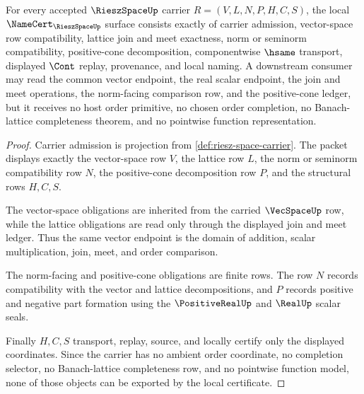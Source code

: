 \begin{theorem}
\label{thm:riesz-space-namecert-obligations}
For every accepted $\RieszSpaceUp$ carrier $R=(V,L,N,P,H,C,S)$, the local $\NameCert_{\RieszSpaceUp}$ surface consists exactly of carrier admission, vector-space row compatibility, lattice join and meet exactness, norm or seminorm compatibility, positive-cone decomposition, componentwise $\hsame$ transport, displayed $\Cont$ replay, provenance, and local naming. A downstream consumer may read the common vector endpoint, the real scalar endpoint, the join and meet operations, the norm-facing comparison row, and the positive-cone ledger, but it receives no host order primitive, no chosen order completion, no Banach-lattice completeness theorem, and no pointwise function representation.
\end{theorem}
\begin{proof}
Carrier admission is projection from \autoref{def:riesz-space-carrier}. The packet displays exactly the vector-space row $V$, the lattice row $L$, the norm or seminorm compatibility row $N$, the positive-cone decomposition row $P$, and the structural rows $H,C,S$.

The vector-space obligations are inherited from the carried $\VecSpaceUp$ row, while the lattice obligations are read only through the displayed join and meet ledger. Thus the same vector endpoint is the domain of addition, scalar multiplication, join, meet, and order comparison.

The norm-facing and positive-cone obligations are finite rows. The row $N$ records compatibility with the vector and lattice decompositions, and $P$ records positive and negative part formation using the $\PositiveRealUp$ and $\RealUp$ scalar seals.

Finally $H,C,S$ transport, replay, source, and locally certify only the displayed coordinates. Since the carrier has no ambient order coordinate, no completion selector, no Banach-lattice completeness row, and no pointwise function model, none of those objects can be exported by the local certificate.
\end{proof}

